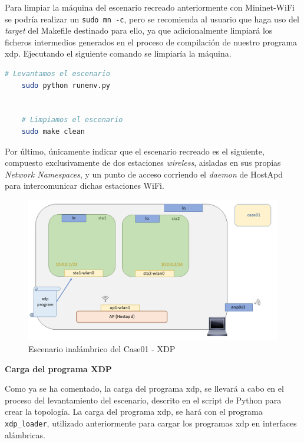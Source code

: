 Para limpiar la máquina del escenario recreado anteriormente con Mininet-WiFi se podría realizar un \texttt{sudo mn -c}, pero se recomienda al usuario que haga uso del \textit{target} del Makefile destinado para ello, ya que adicionalmente limpiará los ficheros intermedios generados en el proceso de compilación de nuestro programa \gls{xdp}. Ejecutando el siguiente comando se limpiaría la máquina.

\begin{lstlisting}[language= bash, style=Consola, caption={Compilación programa XDP - Case01},label=code:case01_xdp_wifi_run]
    # Levantamos el escenario
    sudo python runenv.py
    
    
    # Limpiamos el escenario
    sudo make clean
\end{lstlisting}
\vspace{0.5cm}

Por último, únicamente indicar que el escenario recreado es el siguiente, compuesto exclusivamente de dos estaciones \textit{wireless}, aisladas en sus propias \textit{Network Namespaces}, y un punto de acceso corriendo el \textit{daemon} de HostApd para intercomunicar dichas estaciones WiFi.

\begin{figure}[ht]
    \centering
    \includegraphics[width=16cm]{archivos/img/dev/xdp-wifi/case01/scenario.png}
    \caption{Escenario inalámbrico del Case01 - XDP}
    \label{fig:case01_xdp_wifi_scenario}
\end{figure}

\vspace{0.5cm}
\textbf{Carga del programa XDP}\\
\par

Como ya se ha comentado, la carga del programa \gls{xdp}, se llevará a cabo en el proceso del levantamiento del escenario, descrito en el script de Python para crear la topología. La carga del programa \gls{xdp}, se hará con el programa \texttt{xdp\_loader}, utilizado anteriormente para cargar los programas \gls{xdp} en interfaces alámbricas. 

